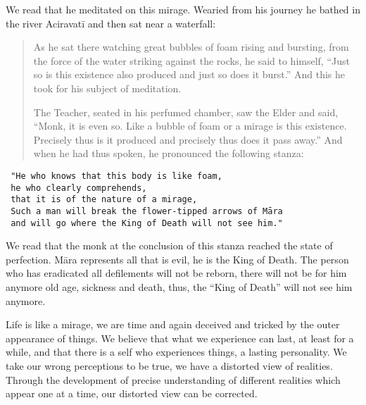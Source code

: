 \documentclass{book}
\begin{document}
We read that he meditated on this mirage. Wearied from his journey he
bathed in the river Aciravatī and then sat near a waterfall:

\begin{quote}
As he sat there watching great bubbles of foam rising and bursting, from
the force of the water striking against the rocks, he said to himself,
``Just so is this existence also produced and just so does it burst.''
And this he took for his subject of meditation.

The Teacher, seated in his perfumed chamber, saw the Elder and said,
``Monk, it is even so. Like a bubble of foam or a mirage is this
existence. Precisely thus is it produced and precisely thus does it pass
away.'' And when he had thus spoken, he pronounced the following stanza:
\end{quote}

\begin{verbatim}
 "He who knows that this body is like foam, 
 he who clearly comprehends,
 that it is of the nature of a mirage,
 Such a man will break the flower-tipped arrows of Māra
 and will go where the King of Death will not see him."
\end{verbatim}

We read that the monk at the conclusion of this stanza reached the state
of perfection. Māra represents all that is evil, he is the King of
Death. The person who has era­dicated all defilements will not be
reborn, there will not be for him anymore old age, sickness and death,
thus, the ``King of Death'' will not see him anymore.

Life is like a mirage, we are time and again deceived and tricked by the
outer appearance of things. We believe that what we experience can last,
at least for a while, and that there is a self who experiences things, a
lasting person­ality. We take our wrong perceptions to be true, we have
a distorted view of realities. Through the development of precise
understanding of different realities which appear one at a time, our
distorted view can be corrected.
\end{document}
